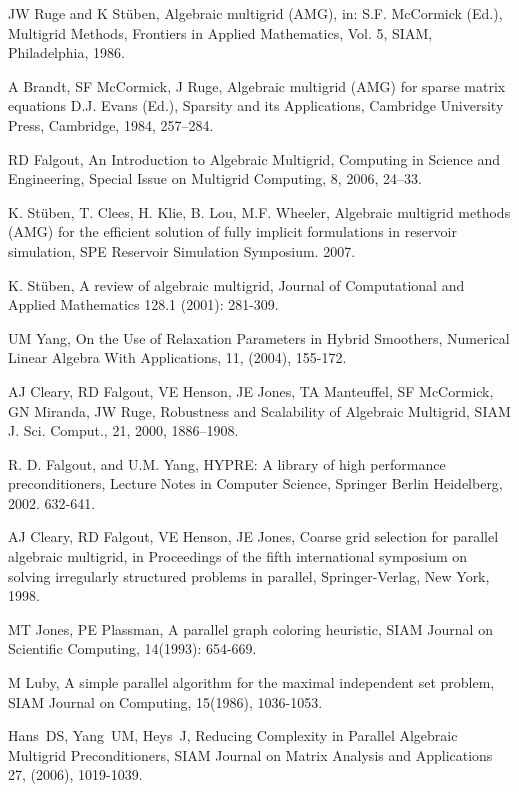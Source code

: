 \documentclass[12pt]{book}
\begin{document}
\begin{thebibliography}{00}

{JW Ruge and K St\"{u}ben}, {Algebraic multigrid (AMG)},
in: S.F. McCormick (Ed.), Multigrid Methods, Frontiers in Applied Mathematics, Vol. 5, SIAM, Philadelphia, 1986.

{A Brandt, SF McCormick, J Ruge},
Algebraic multigrid (AMG) for sparse matrix equations
D.J. Evans (Ed.), Sparsity and its Applications, Cambridge University Press, Cambridge, 1984, 257--284.

RD Falgout, An Introduction to Algebraic Multigrid, Computing in Science and Engineering,
Special Issue on Multigrid Computing, 8, 2006, 24--33.

K. St\"{u}ben, T. Clees, H. Klie, B. Lou, M.F. Wheeler,
Algebraic multigrid methods (AMG) for the efficient solution of fully implicit formulations in reservoir simulation,
SPE Reservoir Simulation Symposium. 2007.

K. St\"{u}ben,
A review of algebraic multigrid,
Journal of Computational and Applied Mathematics 128.1 (2001): 281-309.

UM Yang, On the Use of Relaxation Parameters in Hybrid Smoothers,
Numerical Linear Algebra With Applications, 11, (2004), 155-172.

{AJ Cleary, RD Falgout, VE Henson, JE Jones, TA Manteuffel, SF McCormick,
GN Miranda, JW Ruge}, {Robustness and Scalability of Algebraic Multigrid}, SIAM J. Sci. Comput., 21, 2000, 1886--1908.

R. D. Falgout, and U.M. Yang, HYPRE: A library of high performance preconditioners,
Lecture Notes in Computer Science, Springer Berlin Heidelberg, 2002. 632-641.

AJ Cleary, RD Falgout, VE Henson, JE Jones, Coarse grid selection for parallel algebraic multigrid, in Proceedings of the
fifth international symposium on solving irregularly structured problems in parallel, Springer-Verlag, New York, 1998.

MT Jones, PE Plassman, A parallel graph coloring heuristic, SIAM Journal on Scientific Computing, 14(1993): 654-669.

M Luby, A simple parallel algorithm for the maximal independent set problem,
SIAM Journal on Computing, 15(1986), 1036-1053.

Hans~DS, Yang~UM, Heys~J,
Reducing Complexity in Parallel Algebraic Multigrid Preconditioners,
SIAM Journal on Matrix Analysis and Applications 27, (2006), 1019-1039.
\end{thebibliography}
\end{document}
